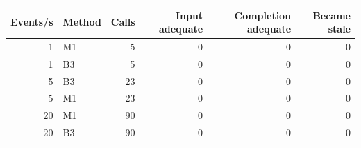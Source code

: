 \begin{tabular}{rlrrrr}
\toprule
Events/s & Method & Calls & Input adequate & Completion adequate & Became stale \\
\midrule
1 & M1 & 5 & 0 & 0 & 0 \\
1 & B3 & 5 & 0 & 0 & 0 \\
5 & B3 & 23 & 0 & 0 & 0 \\
5 & M1 & 23 & 0 & 0 & 0 \\
20 & M1 & 90 & 0 & 0 & 0 \\
20 & B3 & 90 & 0 & 0 & 0 \\
\bottomrule
\end{tabular}
